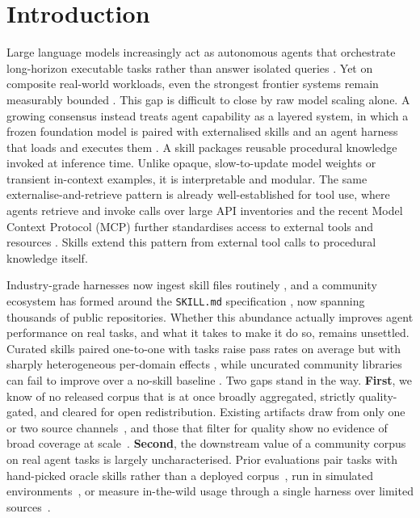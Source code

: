 \section{Introduction}
\label{sec:intro}

Large language models increasingly act as autonomous agents that
orchestrate long-horizon executable tasks rather than answer
isolated queries \citep{Yao2023ReAct,Shinn2023Reflexion,Park2023Generative}.
Yet on composite real-world workloads, even the strongest
frontier systems remain measurably bounded
\citep{Merrill2026TerminalBench,OpenAIGDPVal2025}.  This
gap is difficult to close by raw model scaling alone.  A growing
consensus instead treats agent capability as a layered system, in
which a frozen foundation model is paired with externalised
skills and an agent harness that loads and executes them
\citep{AnthropicSkillCreator2025}.  A skill
packages reusable procedural knowledge invoked at inference time.
Unlike opaque, slow-to-update model weights or transient
in-context examples, it is interpretable and modular.  
The same externalise-and-retrieve pattern is already well-established for tool use,
where agents retrieve and invoke calls over large API inventories
\citep{Qin2024ToolLLM,Patil2023Gorilla} and the recent Model Context Protocol (MCP) further standardises access to external tools and resources \citep{Hou2025MCP,MCPCorpus2025}.
Skills extend this pattern from external tool calls to
procedural knowledge itself.

Industry-grade harnesses now ingest skill files routinely
\citep{AnthropicClaudeCode2025,OpenAIClaudeCode2025}, and a
community ecosystem has formed around the \texttt{SKILL.md}
specification \citep{AnthropicSkillCreator2025}, now spanning
thousands of public repositories.  Whether this abundance actually improves agent performance on real tasks, and what it takes to make it do so, remains
unsettled.  Curated skills paired one-to-one with tasks raise pass
rates on average but with sharply heterogeneous per-domain effects
\citep{SkillsBench2026}, while uncurated community libraries can
fail to improve over a no-skill baseline
\citep{SkillFlow2026,UCSBSkillsWild2026}.  Two gaps stand in the
way.  \textbf{First}, we know of no released corpus that is at once broadly
aggregated, strictly quality-gated, and cleared for open
redistribution.  Existing
artifacts draw from only one or two source channels~\citep{SkillFlow2026,UCSBSkillsWild2026}, and those that filter for quality show no evidence of broad coverage at
scale~\citep{SkillNet2026}.  
\textbf{Second}, the downstream value of a community corpus on real agent tasks is largely uncharacterised. Prior evaluations pair tasks with hand-picked oracle skills rather than a deployed corpus~\citep{SkillsBench2026}, run in simulated environments~\citep{SkillNet2026}, or measure in-the-wild usage through a single harness over limited sources~\citep{UCSBSkillsWild2026}.

